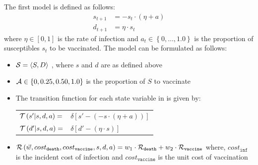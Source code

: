 The first model is defined as follows:
\begin{align*}
    s_{t + 1} &= - s_t \cdot ( \eta + a ) \\
    d_{t+1} &= \eta \cdot s_t 
\end{align*}
where {\footnotesize $ \eta \in [0, 1]$} is the rate of infection and {\footnotesize $ a_t \in \left\lbrace 0, \ldots, 1.0\right\rbrace $} is the proportion of susceptibles {\footnotesize $ s_t $} to be vaccinated. The model can be formulated as follows:
\begin{itemize}
    \item {\footnotesize $ \mathcal{S} = \left\langle S, D \right\rangle$ }, where $ s $ and $ d $ are as defined above
    \item {\footnotesize $ \mathcal{A} \in \left\lbrace 0, 0.25, 0.50, 1.0 \right\rbrace $} is the proportion of $ S $ to vaccinate
    \item The transition function {\footnotesize \Transition} for each state variable in {\footnotesize \State} is given by:    \\
    {\footnotesize 
        \abovedisplayskip=5pt
        \belowdisplayskip=0pt
        \renewcommand{\arraystretch}{1.5}
        \begin{tabular}{ll}
            $ \mathcal{T}\left( s' | s, d, a \right) =$ & $ \delta \left[ s' - (- s \cdot (\eta + a)) \right] $ \\
            $ \mathcal{T}\left( d' | s, d, a \right) =$ & $ \delta \left[ d' - (\eta \cdot s) \right] $ \\
        \end{tabular}
    }%
    \item {\footnotesize $ \mathcal{R}\left(\vec{w}, cost_{\mathtt{death}}, cost_{\mathtt{vaccine}}, s, d, a \right) = w_1 \cdot \mathcal{R}_{\mathtt{death}} + w_2 \cdot \mathcal{R}_{\mathtt{vaccine}}$} where, {\footnotesize $ cost_{\mathtt{inf}} $} is the incident cost of infection and {\footnotesize $ cost_{\mathtt{vaccine}} $} is the unit cost of vaccination \\
    {\footnotesize 
        \abovedisplayskip=10pt
        \belowdisplayskip=0pt
        \renewcommand{\arraystretch}{1.5}
        }
\end{itemize}
